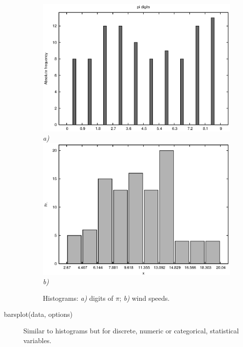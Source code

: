\documentclass[12pt,a4paper]{article}
\begin{document}
\begin{description}
\begin{figure}
\begin{center}
\includegraphics[scale=1.0]{histogram1.eps} \\
\emph{a)} \\ 
\includegraphics[scale=1.0]{histogram2.eps} \\
\emph{b)} \\
\caption{Histograms: \emph{a)} digits of $\pi$; \emph{b)} wind speeds.}
\label{fig4}
\end{center}
\end{figure}

\item[barsplot(data, options)] Similar to histograms but for discrete, numeric or categorical, statistical variables.


\end{description}
\end{document}
